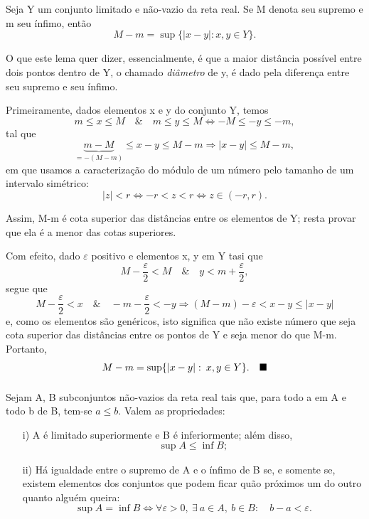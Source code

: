 \documentclass[../analysisII_notes.tex]{subfiles}
\begin{document}
\begin{lemma*}
	Seja Y um conjunto limitado e não-vazio da reta real. Se M denota seu supremo e m seu ínfimo, então
	\[
		M-m = \sup_{}\{|x-y|:x, y\in Y\}.
	\]
\end{lemma*}
O que este lema quer dizer, essencialmente, é que a maior distância possível entre dois pontos dentro de Y, o chamado \textit{diâmetro} de y, é dado pela diferença entre seu supremo e seu ínfimo.
\begin{proof*}
	Primeiramente, dados elementos x e y do conjunto Y, temos
	\[
		m\leq x\leq M \quad\&\quad m\leq y\leq M \Longleftrightarrow -M\leq -y\leq -m,
	\]
	tal que
	\[
		\underbrace{m-M}_{=-(M-m)} \leq x-y \leq M-m \Rightarrow |x-y|\leq M-m,
	\]
	em que usamos a caracterização do módulo de um número pelo tamanho de um intervalo simétrico:
	\[
		|z|<r \Longleftrightarrow -r < z < r \Longleftrightarrow z\in (-r, r).
	\]

	Assim, M-m é cota superior das distâncias entre os elementos de Y; resta provar que ela é a menor das cotas superiores.

	Com efeito, dado \(\varepsilon \) positivo e elementos x, y em Y tasi que
	\[
		M-\frac{\varepsilon }{2}<M \quad\&\quad y < m + \frac{\varepsilon }{2},
	\]
	segue que
	\[
		M-\frac{\varepsilon }{2}<x \quad\&\quad -m-\frac{\varepsilon }{2}<-y \Rightarrow (M-m)-\varepsilon < x-y\leq |x-y|
	\]
	e, como os elementos são genéricos, isto significa que não existe número que seja cota superior das distâncias entre os pontos de Y e seja menor do que M-m. Portanto,
	\[
		M-m = \sup_{}\{|x-y|:\: x, y\in Y\}.\quad \text{$\blacksquare$}
	\]
\end{proof*}
\begin{lemma*}
	Sejam A, B subconjuntos não-vazios da reta real tais que, para todo a em A e todo b de B, tem-se \(a\leq b\). Valem as propriedades:
	\begin{itemize}
		\item[i)] A é limitado superiormente e B é inferiormente; além disso,
		      \[
			      \sup_{}A\leq \inf_{}B;
		      \]
		\item[ii)] Há igualdade entre o supremo de A e o ínfimo de B se, e somente se, existem elementos dos conjuntos que podem ficar quão próximos um do outro quanto alguém queira:
		      \[
			      \sup_{}A = \inf_{}B \Longleftrightarrow \forall \varepsilon > 0,\: \exists \: a\in A,\:b\in B:\quad b-a<\varepsilon .
		      \]
	\end{itemize}
\end{lemma*}
\end{document}
